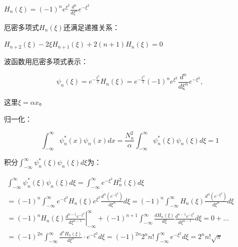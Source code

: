 \begin{center}
$H_n \left( \xi  \right) = \left( { - 1} \right)^n e^{\xi ^2 } \frac{{d^n }}{{d\xi ^n }}e^{ - \xi ^2 } $
\end{center}

厄密多项式$H_n (\xi )$还满足递推关系：

\begin{center}
$H_{n + 2} \left( \xi  \right) - 2\xi H_{n + 1} \left( \xi  \right) + 2(n + 1)H_n \left( \xi  \right) = 0$
\end{center}

波函数用厄密多项式表示：

\begin{equation*}
\psi _n (\xi ) = e^{ - \frac{{\xi ^2 }}{2}} H_n \left( \xi  \right) = e^{ - \frac{{\xi ^2 }}{2}} \left( { - 1} \right)^n e^{\xi ^2 } \frac{{d^n }}{{d\xi ^n }}e^{ - \xi ^2 },
\end{equation*}

这里$\xi  = \alpha x$。

归一化：

\begin{equation*}
\int_{ - \infty }^\infty  {\psi _n ^* (x)\psi _n (x)dx}  = \frac{{N_n ^2 }}{\alpha }\int_{ - \infty }^\infty  {\psi _n ^* (\xi )\psi _n (\xi )} d\xi  = 1
\end{equation*}

积分$\int_{ - \infty }^\infty  {\psi _n ^* (\xi )\psi _n (\xi )} d\xi $为：

\begin{center}
$\begin{array}{l}
 \int_{ - \infty }^\infty  {\psi _n ^* (\xi )\psi _n (\xi )} d\xi  = \int_{ - \infty }^\infty  {e^{ - \xi ^2 } H_n ^2 \left( \xi  \right)} d\xi  \\
  = \left( { - 1} \right)^n \int_{ - \infty }^\infty  {e^{ - \xi ^2 } H_n \left( \xi  \right)e^{\xi ^2 } \frac{{d^n \left( {e^{ - \xi ^2 } } \right)}}{{d\xi ^n }}d\xi }  = \left( { - 1} \right)^n \int_{ - \infty }^\infty  {H_n \left( \xi  \right)} \frac{{d^n \left( {e^{ - \xi ^2 } } \right)}}{{d\xi ^n }}d\xi  \\
  = \left. {\left( { - 1} \right)^n H_n \left( \xi  \right)\frac{{d^{n - 1} e^{ - \xi ^2 } }}{{d\xi ^{n - 1} }}} \right|_{ - \infty }^\infty   + \left( { - 1} \right)^{n + 1} \int_{ - \infty }^\infty  {\frac{{dH_n \left( \xi  \right)}}{{d\xi }}\frac{{d^{n - 1} e^{ - \xi ^2 } }}{{d\xi ^{n - 1} }}d\xi }  = 0 + ... \\
  = \left( { - 1} \right)^{2n} \int_{ - \infty }^\infty  {\frac{{d^n H_n \left( \xi  \right)}}{{d\xi ^n }}}  \cdot e^{ - \xi ^2 } d\xi  = \left( { - 1} \right)^{2n} 2^n n!\int_{ - \infty }^\infty  {e^{ - \xi ^2 } d\xi }  = 2^n n!\sqrt \pi   \\
 \end{array}$
\end{center}

